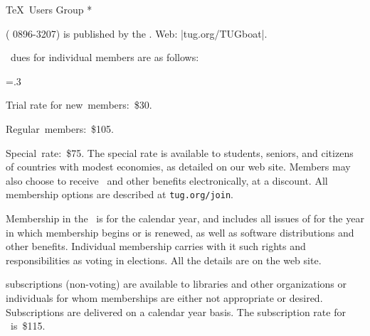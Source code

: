 


\TUBfinal

\def\rateyear{\the\year}
\def\tug{\acro{TUG}}
\def\rtitle{}

\def\USA{U\kern-.12em.\kern.04em S\kern-.06em.\kern.06em A\null.}

\head * \TeX\ Users Group *

\TUB\/ ( 0896-3207) is published by the\newline
\TUG{}. Web: |tug.org/TUGboat|.

\bigskip {}

\noindent
\rateyear\ dues for individual members are as follows:

\begingroup
\raggedstretch=.3\colwd
\raggedright
{}
\item{\bull} Trial rate for new~members:~\$30.
\item{\bull} Regular~members:~\$105.
\item{\bull} Special~rate:~\$75.
\unskip\endgraf
\endgroup       %
\noindent The special rate is available to students, seniors, and
citizens of countries with modest economies, as detailed on our web
site.
Members may also choose to receive \TUB\ and other benefits
electronically, at a discount. All membership 
options are described at {\tt tug.org/join}.

Membership in the \TUG\ is for the calendar year, and includes all issues
of \TUB\/ for the year in which membership begins or is renewed, as well
as software distributions and other benefits.
Individual membership carries with
it such rights and responsibilities as voting in  elections.
All the details are on the  web site.

\bigskip {}

\noindent \TUB\/ subscriptions (non-voting) are available to libraries
and other organizations or individuals for whom 
memberships are either not appropriate or desired.
Subscriptions are delivered on a calendar year basis.
The subscription rate for
\rateyear\ is~\$115.

